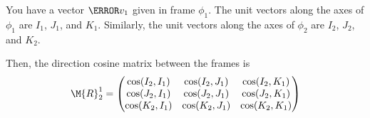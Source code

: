 You have a vector $\V{v}_1$ given in frame $\phi_1$. The unit vectors along the axes of $\phi_1$ are $I_1$, $J_1$, and $K_1$. Similarly, the unit vectors along the axes of $\phi_2$ are $I_2$, $J_2$, and $K_2$.

Then, the direction cosine matrix between the frames is
\begin{equation}
    \M{R}_2^1
    =
    \begin{pmatrix}
        \cos(I_2, I_1) & \cos(I_2, J_1) & \cos(I_2, K_1) \\
        \cos(J_2, I_1) & \cos(J_2, J_1) & \cos(J_2, K_1) \\
        \cos(K_2, I_1) & \cos(K_2, J_1) & \cos(K_2, K_1) \\
    \end{pmatrix}
\end{equation}
